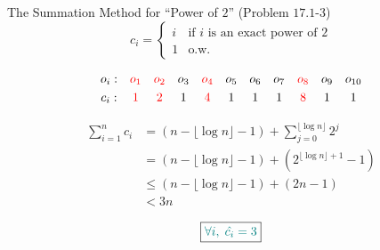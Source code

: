
\begin{frame}{}
  \begin{exampleblock}{The Summation Method for ``Power of $2$'' (Problem $17.1$-$3$)}
    \begin{displaymath}
      c_i = \left\{ \begin{array}{ll}
	i & \textrm{if $i$ is an exact power of 2}\\
	1 & \textrm{o.w.}
      \end{array} \right.
    \end{displaymath}

    \[
      \begin{array}{ccccccccccc}
	o_i:  & \textcolor{red}{o_1} & \textcolor{red}{o_2} & o_3 & \textcolor{red}{o_4} & o_5 & o_6 & o_7 & \textcolor{red}{o_8} & o_9 & o_{10} \\[3pt]
	c_i:  & \textcolor{red}{1}   & \textcolor{red}{2}   & 1   & \textcolor{red}{4}   & 1   & 1   & 1   & \textcolor{red}{8}   & 1   & 1  \\
      \end{array}
    \]
  \end{exampleblock}

  \pause
  \begin{align*}
    \sum_{i=1}^{n} c_i &= (n - \lfloor \log n \rfloor - 1) + \sum_{j=0}^{\lfloor \log n \rfloor} 2^{j} \\
      &= (n - \lfloor \log n \rfloor - 1) + (2^{\lfloor \log n \rfloor + 1} - 1) \\
      &\le (n - \lfloor \log n \rfloor - 1) + (2n - 1) \\
      &< 3n
  \end{align*}

  \pause
  \[
    \boxed{\textcolor{teal}{\forall i,\; \hat{c_i} = 3}}
  \]
\end{frame}

